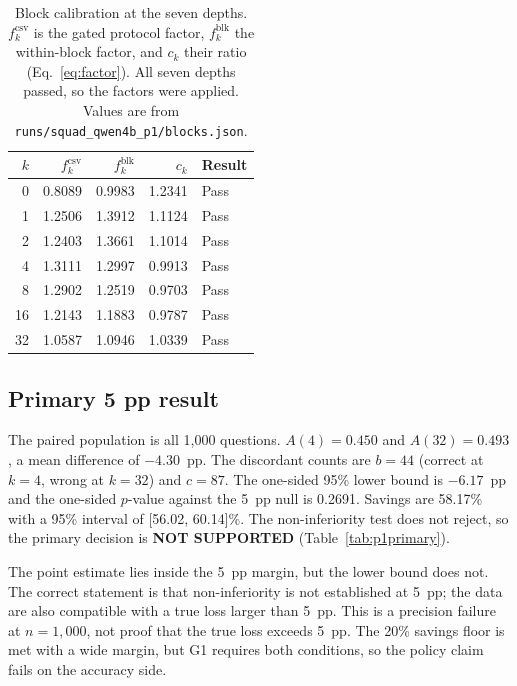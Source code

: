 \documentclass[a4paper,fleqn]{cas-sc}
\begin{document}
\begin{table}[pos=htbp]
  \centering
  \caption{Block calibration at the seven depths. $f^{\mathrm{csv}}_k$ is the gated protocol
  factor, $f^{\mathrm{blk}}_k$ the within-block factor, and $c_k$ their ratio
  (Eq.~\ref{eq:factor}). All seven depths passed, so the factors were applied. Values are from
  \texttt{runs/squad\_qwen4b\_p1/blocks.json}.}
  \label{tab:p1factors}
  \small
  \setlength{\tabcolsep}{4pt}
  \begin{tabular}{rrrrl}
    \toprule
    \textbf{$k$} & \textbf{$f^{\mathrm{csv}}_k$} & \textbf{$f^{\mathrm{blk}}_k$} & \textbf{$c_k$} & \textbf{Result} \\
    \midrule
    0  & 0.8089 & 0.9983 & 1.2341 & Pass \\
    1  & 1.2506 & 1.3912 & 1.1124 & Pass \\
    2  & 1.2403 & 1.3661 & 1.1014 & Pass \\
    4  & 1.3111 & 1.2997 & 0.9913 & Pass \\
    8  & 1.2902 & 1.2519 & 0.9703 & Pass \\
    16 & 1.2143 & 1.1883 & 0.9787 & Pass \\
    32 & 1.0587 & 1.0946 & 1.0339 & Pass \\
    \bottomrule
  \end{tabular}
\end{table}

\subsection{Primary 5 pp result}

The paired population is all 1{,}000 questions. $A(4)=0.450$ and $A(32)=0.493$, a mean
difference of $-4.30$~pp. The discordant counts are $b=44$ (correct at $k=4$, wrong at $k=32$)
and $c=87$. The one-sided 95\% lower bound is $-6.17$~pp and the one-sided $p$-value against the
5~pp null is 0.2691. Savings are 58.17\% with a 95\% interval of [56.02, 60.14]\%. The
non-inferiority test does not reject, so the primary decision is \textbf{NOT SUPPORTED}
(Table~\ref{tab:p1primary}).

The point estimate lies inside the 5~pp margin, but the lower bound does not. The correct
statement is that non-inferiority is not established at 5~pp; the data are also compatible with
a true loss larger than 5~pp. This is a precision failure at $n=1{,}000$, not proof that the true
loss exceeds 5~pp. The 20\% savings floor is met with a wide margin, but G1 requires both
conditions, so the policy claim fails on the accuracy side.
\end{document}
